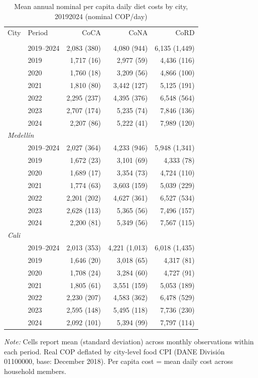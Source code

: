 \begin{table}[htbp]
\centering\small
\caption{Mean annual nominal per capita daily diet costs by city, 2019\textendash{}2024 (nominal COP/day)}
\label{tab:cost_nominal}
\begin{tabular}{llrrr}
\toprule
City & Period & CoCA & CoNA & CoRD \\
\addlinespace[2pt]
\midrule
\multicolumn{5}{l}{\textit{Bogotá}} \\
 & 2019–2024 & 2,083 (380) & 4,080 (944) & 6,135 (1,449) \\
 & 2019 & 1,717 (16) & 2,977 (59) & 4,436 (116) \\
 & 2020 & 1,760 (18) & 3,209 (56) & 4,866 (100) \\
 & 2021 & 1,810 (80) & 3,442 (127) & 5,125 (191) \\
 & 2022 & 2,295 (237) & 4,395 (376) & 6,548 (564) \\
 & 2023 & 2,707 (174) & 5,235 (74) & 7,846 (136) \\
 & 2024 & 2,207 (86) & 5,222 (41) & 7,989 (120) \\
\midrule
\multicolumn{5}{l}{\textit{Medellín}} \\
 & 2019–2024 & 2,027 (364) & 4,233 (946) & 5,948 (1,341) \\
 & 2019 & 1,672 (23) & 3,101 (69) & 4,333 (78) \\
 & 2020 & 1,689 (17) & 3,354 (73) & 4,724 (110) \\
 & 2021 & 1,774 (63) & 3,603 (159) & 5,039 (229) \\
 & 2022 & 2,201 (202) & 4,627 (361) & 6,527 (534) \\
 & 2023 & 2,628 (113) & 5,365 (56) & 7,496 (157) \\
 & 2024 & 2,200 (81) & 5,349 (56) & 7,567 (115) \\
\midrule
\multicolumn{5}{l}{\textit{Cali}} \\
 & 2019–2024 & 2,013 (353) & 4,221 (1,013) & 6,018 (1,435) \\
 & 2019 & 1,646 (20) & 3,018 (65) & 4,317 (81) \\
 & 2020 & 1,708 (24) & 3,284 (60) & 4,727 (91) \\
 & 2021 & 1,805 (61) & 3,551 (159) & 5,053 (189) \\
 & 2022 & 2,230 (207) & 4,583 (362) & 6,478 (529) \\
 & 2023 & 2,595 (148) & 5,495 (118) & 7,736 (230) \\
 & 2024 & 2,092 (101) & 5,394 (99) & 7,797 (114) \\
\bottomrule
\end{tabular}
\begin{minipage}{\linewidth}
\vspace{2pt}\footnotesize
\textit{Note:} Cells report mean (standard deviation) across monthly observations within each period. Real COP deflated by city-level food CPI (DANE Divisi\'{o}n 01100000, base: December 2018). Per capita cost = mean daily cost across household members.
\end{minipage}
\end{table}
